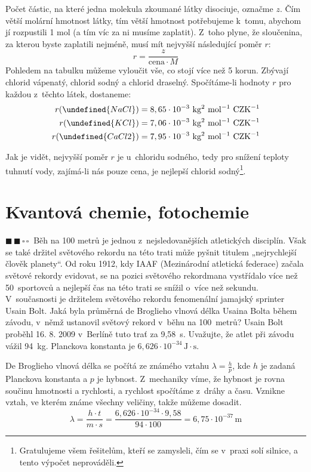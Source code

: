 \documentclass{book}
\let\ch\undefined
\newcommand{\dva}{$\blacksquare \, \blacksquare \, \square \, \square \; \; $}
\renewenvironment{quotation}{\par}{\par} %
\begin{document}
Počet částic, na které jedna molekula zkoumané látky disociuje,
označme $z$. Čím větší molární hmotnost látky, tím větší hmotnost
potřebujeme k~tomu, abychom jí rozpustili 1 mol (a tím víc za ni
musíme zaplatit). Z~toho plyne, že sloučenina, za kterou byste zaplatili
nejméně, musí mít nejvyšší následující poměr $r$: 
\[
r=\frac{z}{\text{cena}\cdot M}
\]
Pohledem na tabulku můžeme vyloučit vše, co stojí více než 5 korun.
Zbývají chlorid vápenatý, chlorid sodný a chlorid draselný. Spočítáme-li
hodnoty $r$ pro každou z~těchto látek, dostaneme: 
\begin{align*}
r(\ch{NaCl}) & =8,65\cdot10^{-3}\mathrm{~kg^{2}~mol^{-1}~CZK^{-1}}\\
r(\ch{KCl}) & =7,06\cdot10^{-3}\mathrm{~kg^{2}~mol^{-1}~CZK^{-1}}\\
r(\ch{CaCl2}) & =7,95\cdot10^{-3}\mathrm{~kg^{2}~mol^{-1}~CZK^{-1}}
\end{align*}

Jak je vidět, nejvyšší poměr $r$ je u~chloridu sodného, tedy pro
snížení teploty tuhnutí vody, zajímá-li nás pouze cena, je nejlepší
chlorid sodný\footnote{Gratulujeme všem řešitelům, kteří se zamysleli, čím se v~praxi solí silnice, a tento výpočet neprováděli.}.

\section{Kvantová chemie, fotochemie}

\begin{quotation}
\dva Běh na 100 metrů je jednou z~nejsledovanějších atletických disciplín.
Však se také držitel světového rekordu na této trati může pyšnit titulem
„nejrychlejší člověk planety“. Od roku 1912, kdy IAAF (Mezinárodní
atletická federace) začala světové rekordy evidovat, se na pozici
světového rekordmana vystřídalo více než 50~sportovců a nejlepší čas
na této trati se snížil o~více než sekundu. V~současnosti je držitelem
světového rekordu fenomenální jamajský sprinter Usain Bolt. Jaká byla
průměrná de Broglieho vlnová délka Usaina Bolta během závodu, v~němž
ustanovil světový rekord v~běhu na 100~metrů? Usain Bolt proběhl 16.
8. 2009 v~Berlíně tuto trať za 9,58~s. Uvažujte, že atlet při závodu
vážil 94~kg. Planckova konstanta je $6,626\cdot10^{-34}\,\mathrm{J\cdot s}$.
\end{quotation} \dotfill \par 
De Broglieho vlnová délka se počítá ze známého vztahu $\lambda=\frac{h}{p}$,
kde $h$ je zadaná Planckova konstanta a $p$ je hybnost. Z~mechaniky
víme, že hybnost je rovna součinu hmotnosti a rychlosti, a rychlost
spočítáme z\ dráhy a času. Vznikne vztah, ve kterém známe všechny
veličiny, takže můžeme dosadit. 
\[
\lambda=\frac{h\cdot t}{m\cdot s}=\frac{6,626\cdot10^{-34}\cdot9,58}{94\cdot100}=6,75\cdot10^{-37}\mathrm{\,m}
\]
\end{document}
